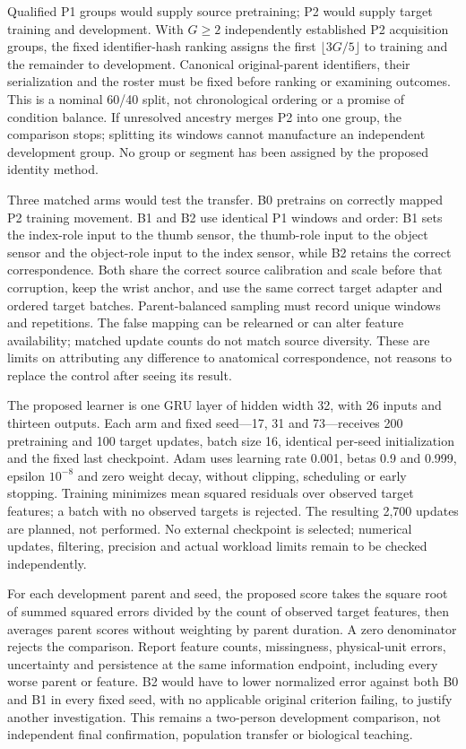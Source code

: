 Qualified P1 groups would supply source pretraining; P2 would supply target training and development. With $G\geq2$ independently established P2 acquisition groups, the fixed identifier-hash ranking assigns the first $\lfloor3G/5\rfloor$ to training and the remainder to development. Canonical original-parent identifiers, their serialization and the roster must be fixed before ranking or examining outcomes. This is a nominal 60/40 split, not chronological ordering or a promise of condition balance. If unresolved ancestry merges P2 into one group, the comparison stops; splitting its windows cannot manufacture an independent development group. No group or segment has been assigned by the proposed identity method.

Three matched arms would test the transfer. B0 pretrains on correctly mapped P2 training movement. B1 and B2 use identical P1 windows and order: B1 sets the index-role input to the thumb sensor, the thumb-role input to the object sensor and the object-role input to the index sensor, while B2 retains the correct correspondence. Both share the correct source calibration and scale before that corruption, keep the wrist anchor, and use the same correct target adapter and ordered target batches. Parent-balanced sampling must record unique windows and repetitions. The false mapping can be relearned or can alter feature availability; matched update counts do not match source diversity. These are limits on attributing any difference to anatomical correspondence, not reasons to replace the control after seeing its result.

The proposed learner is one GRU layer of hidden width 32, with 26 inputs and thirteen outputs. Each arm and fixed seed---17, 31 and 73---receives 200 pretraining and 100 target updates, batch size 16, identical per-seed initialization and the fixed last checkpoint. Adam uses learning rate 0.001, betas 0.9 and 0.999, epsilon $10^{-8}$ and zero weight decay, without clipping, scheduling or early stopping. Training minimizes mean squared residuals over observed target features; a batch with no observed targets is rejected. The resulting 2,700 updates are planned, not performed. No external checkpoint is selected; numerical updates, filtering, precision and actual workload limits remain to be checked independently.

For each development parent and seed, the proposed score takes the square root of summed squared errors divided by the count of observed target features, then averages parent scores without weighting by parent duration. A zero denominator rejects the comparison. Report feature counts, missingness, physical-unit errors, uncertainty and persistence at the same information endpoint, including every worse parent or feature. B2 would have to lower normalized error against both B0 and B1 in every fixed seed, with no applicable original criterion failing, to justify another investigation. This remains a two-person development comparison, not independent final confirmation, population transfer or biological teaching.

